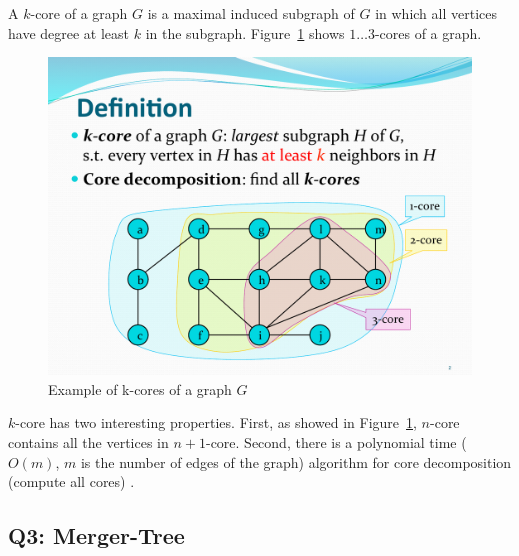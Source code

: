 A $k$-core of a graph $G$ is a maximal induced subgraph of $G$ in which all
vertices have degree at least $k$ in the subgraph. 
Figure~\ref{fig:k-core_example} shows $1 \ldots 3$-cores of a graph. 

\begin{figure}[t]
    \centering
    \includegraphics[width=0.9\linewidth]{images/kcore.pdf}
    \caption{Example of k-cores of a graph $G$}
    \label{fig:k-core_example}
\end{figure}

$k$-core has two interesting properties. First, as showed in 
Figure~\ref{fig:k-core_example}, $n$-core contains all the vertices 
in $n+1$-core. Second, there is a polynomial time ($O(m)$, $m$ is the 
number of edges of the graph) algorithm for 
core decomposition (compute all cores) \cite{BatageljM03CORR}.


\subsection{Q3: Merger-Tree}


